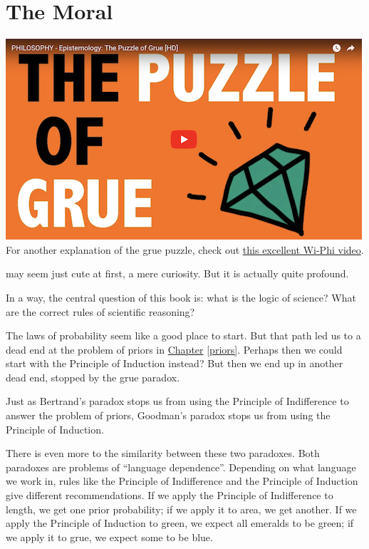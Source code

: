 \documentclass[justified]{tufte-book}
\theoremstyle{definition}
\theoremstyle{definition}
\theoremstyle{definition}
\theoremstyle{remark}
\begin{document}
\hypertarget{the-moral}{%
\section*{The Moral}\label{the-moral}}

\begin{marginfigure}
\href{http://www.wi-phi.com/video/puzzle-grue}{\includegraphics{img/wiphi_grue.png}}
For another explanation of the grue puzzle, check out
\href{http://www.wi-phi.com/video/puzzle-grue}{this excellent Wi-Phi
video}.
\end{marginfigure}

 may seem just cute at first, a mere curiosity. But it is actually quite profound.

In a way, the central question of this book is: what is the logic of science? What are the correct rules of scientific reasoning?

The laws of probability seem like a good place to start. But that path led us to a dead end at the problem of priors in \protect\hyperlink{priors}{Chapter} \ref{priors}. Perhaps then we could start with the Principle of Induction instead? But then we end up in another dead end, stopped by the grue paradox.

Just as Bertrand's paradox stops us from using the Principle of Indifference to answer the problem of priors, Goodman's paradox stops us from using the Principle of Induction.

There is even more to the similarity between these two paradoxes. Both paradoxes are problems of ``language dependence''. Depending on what language we work in, rules like the Principle of Indifference and the Principle of Induction give different recommendations. If we apply the Principle of Indifference to length, we get one prior probability; if we apply it to area, we get another. If we apply the Principle of Induction to green, we expect all emeralds to be green; if we apply it to grue, we expect some to be blue.
\end{document}
